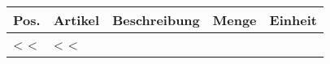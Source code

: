 \renewcommand{\arraystretch}{1.3} %

\begin{tabularx}{\textwidth}{@{}llXrr@{}}

\hline

\textbf{Pos.} & \textbf{Artikel} & \textbf{Beschreibung} & \textbf{Menge} & \textbf{Einheit} \\

\hline

<%
 <%
\ifthenelse{\equal{<%
\ifthenelse{\equal{<%
\ifthenelse{\equal{<%
\ifthenelse{\equal{<%
\ifthenelse{\equal{<%
\ifthenelse{\equal{<%
\ifthenelse{\equal{<%
\ifthenelse{\equal{<%
& <%
<%
\end{tabularx}
\hline